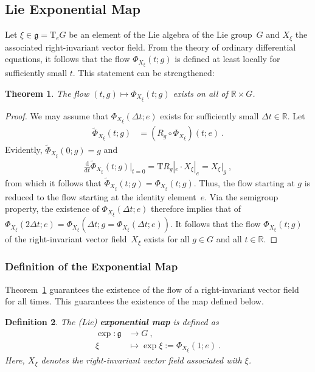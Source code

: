 \documentclass[10pt,a4paper]{article}
\theoremstyle{mytheorem}
\newtheorem{theorem}{Theorem}[section]
\theoremstyle{mydefinition}
\newtheorem{definition}[theorem]{Definition}
\newcommand{\mydef}[1]{\textbf{\textit{#1}}}
\newcommand{\dt}{\mathrm{d}}
\newcommand{\Tt}{\mathrm{T}}
\begin{document}
\subsection{Lie Exponential Map}

Let $\xi\in\mathfrak{g}=\Tt_eG$ be an element of the Lie algebra of the Lie group~$G$ and $X_\xi$ the associated right-invariant vector field.
From the theory of ordinary differential equations, it follows that the flow $\Phi_{X_\xi}(t;g)$ is defined at least locally for sufficiently small $t$.
This statement can be strengthened:
\begin{theorem}
\label{th:PhiGlobal}
The flow $(t, g)\mapsto\Phi_{X_\xi}(t;g)$ exists on all of $\mathbb{R}\times G$.
\end{theorem}
\begin{proof}
We may assume that $\Phi_{X_\xi}(\Delta t;e)$ exists for sufficiently small $\Delta t\in\mathbb{R}$.
Let
\begin{align*}
	\tilde{\Phi}_{X_\xi}(t;g)
	&= (R_g\circ\Phi_{X_\xi})(t;e)
	\ .
\end{align*}
Evidently, $\tilde{\Phi}_{X_\xi}(0;g)=g$ and
\begin{align*}
	\frac{\dt}{\dt t}
		\tilde{\Phi}_{X_\xi}(t;g)
	\Big|_{t=0}
	= \Tt R_g|_e \cdot X_\xi|_e
	= X_\xi|_g
	\ ,
\end{align*}
from which it follows that $\tilde{\Phi}_{X_\xi}(t;g)=\Phi_{X_\xi}(t;g)$.
Thus, the flow starting at $g$ is reduced to the flow starting at the identity element~$e$.
Via the semigroup property, the existence of $\Phi_{X_\xi}(\Delta t;e)$ therefore implies that of $\Phi_{X_\xi}(2\Delta t;e)=\Phi_{X_\xi}(\Delta t;g=\Phi_{X_\xi}(\Delta t;e))$.
It follows that the flow $\Phi_{X_\xi}(t;g)$ of the right-invariant vector field~$X_\xi$ exists for all $g\in G$ and all $t\in\mathbb{R}$.
\end{proof}

\subsubsection{Definition of the Exponential Map}

Theorem~\ref{th:PhiGlobal} guarantees the existence of the flow of a right-invariant vector field for all times.
This guarantees the existence of the map defined below.
\begin{definition}
The (Lie) \mydef{exponential map} is defined as
\begin{align*}
	\exp: 
	\mathfrak{g} &\rightarrow G
	\ ,\nonumber\\
	\xi &\mapsto \exp\xi := \Phi_{X_\xi}(1; e)
	\ .
\end{align*}
Here, $X_\xi$ denotes the right-invariant vector field associated with $\xi$.
\end{definition}
\end{document}
